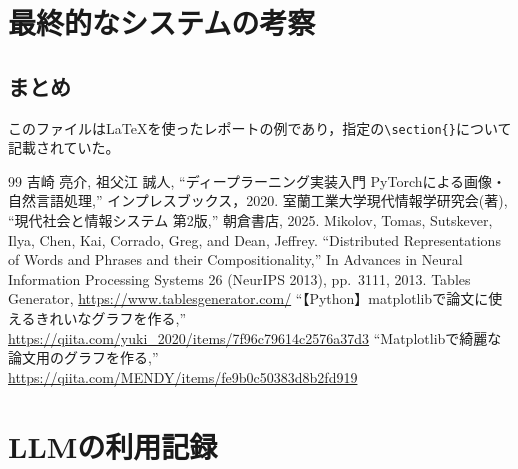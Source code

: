 \documentclass[a4j]{jsarticle}
\begin{document}
\section{最終的なシステムの考察}

\subsection{まとめ}
このファイルは\LaTeX{}を使ったレポートの例であり，指定の\verb|\section{}|について記載されていた。

\begin{thebibliography}{99} 
吉崎 亮介, 祖父江 誠人, ``ディープラーニング実装入門 PyTorchによる画像・自然言語処理,'' インプレスブックス，2020.
室蘭工業大学現代情報学研究会(著), ``現代社会と情報システム 第2版,'' 朝倉書店, 2025.
Mikolov, Tomas, Sutskever, Ilya, Chen, Kai, Corrado, Greg, and Dean, Jeffrey.
``Distributed Representations of Words and Phrases and their Compositionality,'' In Advances in Neural Information Processing Systems 26 (NeurIPS 2013), pp.~3111, 2013.
Tables Generator, \url{https://www.tablesgenerator.com/}
``【Python】matplotlibで論文に使えるきれいなグラフを作る,'' \url{https://qiita.com/yuki_2020/items/7f96c79614c2576a37d3}
``Matplotlibで綺麗な論文用のグラフを作る,'' \url{https://qiita.com/MENDY/items/fe9b0c50383d8b2fd919}
\end{thebibliography}

\appendix


\section{LLMの利用記録}
\end{document}
